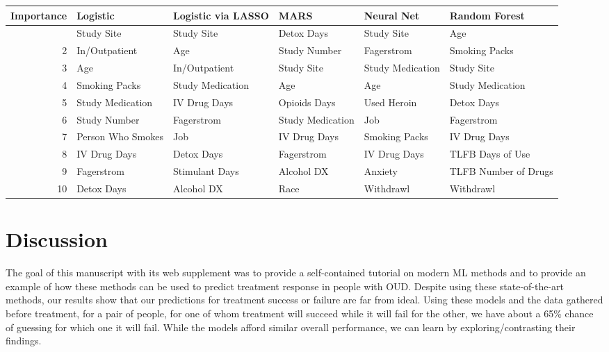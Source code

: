 \documentclass[
  number,
  preprint,
  3p,
  onecolumn]{elsarticle}
\begin{document}
\begin{landscape}
\begin{table}
{\fontsize{12.0pt}{14.4pt}\selectfont
\begin{tabular*}{\linewidth}{@{\extracolsep{\fill}}rlllll}
\toprule
Importance & Logistic & Logistic via LASSO & MARS & Neural Net & Random Forest \\ 
\midrule\addlinespace[2.5pt]
1 & Study Site & Study Site & Detox Days & Study Site & Age \\ 
2 & In/Outpatient & Age & Study Number & Fagerstrom & Smoking Packs \\ 
3 & Age & In/Outpatient & Study Site & Study Medication & Study Site \\ 
4 & Smoking Packs & Study Medication & Age & Age & Study Medication \\ 
5 & Study Medication & IV Drug Days & Opioids Days & Used Heroin & Detox Days \\ 
6 & Study Number & Fagerstrom & Study Medication & Job & Fagerstrom \\ 
7 & Person Who Smokes & Job & IV Drug Days & Smoking Packs & IV Drug Days \\ 
8 & IV Drug Days & Detox Days & Fagerstrom & IV Drug Days & TLFB Days of Use \\ 
9 & Fagerstrom & Stimulant Days & Alcohol DX & Anxiety & TLFB Number of Drugs \\ 
10 & Detox Days & Alcohol DX & Race & Withdrawl & Withdrawl \\ 
\bottomrule
\end{tabular*}

}

\end{table}%

\end{landscape}

\section{Discussion}\label{discussion}

The goal of this manuscript with its web supplement
\citep{balise_supplement_2025} was to provide a self-contained tutorial
on modern ML methods and to provide an example of how these methods can
be used to predict treatment response in people with OUD. Despite using
these state-of-the-art methods, our results show that our predictions
for treatment success or failure are far from ideal. Using these models
and the data gathered before treatment, for a pair of people, for one of
whom treatment will succeed while it will fail for the other, we have
about a 65\% chance of guessing for which one it will fail. While the
models afford similar overall performance, we can learn by
exploring/contrasting their findings.
\end{document}
